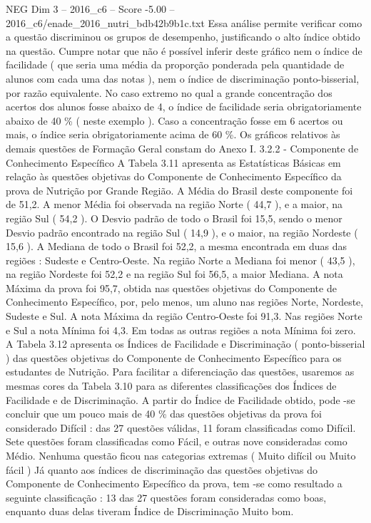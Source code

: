 \begin{textsample}{NEG Dim 3 – 2016\_c6 – Score -5.00 – 2016\_c6/enade\_2016\_nutri\_bdb42b9b1c.txt}
Essa análise permite verificar como a questão discriminou os grupos de desempenho, justificando o alto índice obtido na questão.
Cumpre notar que não é possível inferir deste gráfico nem o índice de facilidade ( que seria uma média da proporção ponderada pela quantidade de alunos com cada uma das notas ), nem o índice de discriminação ponto-bisserial, por razão equivalente.
No caso extremo no qual a grande concentração dos acertos dos alunos fosse abaixo de 4, o índice de facilidade seria obrigatoriamente abaixo de 40 \% ( neste exemplo ).
Caso a concentração fosse em 6 acertos ou mais, o índice seria obrigatoriamente acima de 60 \%.
Os gráficos relativos às demais questões de Formação Geral constam do Anexo I. 3.2.2 - Componente de Conhecimento Específico A Tabela 3.11 apresenta as Estatísticas Básicas em relação às questões objetivas do Componente de Conhecimento Específico da prova de Nutrição por Grande Região.
A Média do Brasil deste componente foi de 51,2.
A menor Média foi observada na região Norte ( 44,7 ), e a maior, na região Sul ( 54,2 ).
O Desvio padrão de todo o Brasil foi 15,5, sendo o menor Desvio padrão encontrado na região Sul ( 14,9 ), e o maior, na região Nordeste ( 15,6 ).
A Mediana de todo o Brasil foi 52,2, a mesma encontrada em duas das regiões : Sudeste e Centro-Oeste.
Na região Norte a Mediana foi menor ( 43,5 ), na região Nordeste foi 52,2 e na região Sul foi 56,5, a maior Mediana.
A nota Máxima da prova foi 95,7, obtida nas questões objetivas do Componente de Conhecimento Específico, por, pelo menos, um aluno nas regiões Norte, Nordeste, Sudeste e Sul.
A nota Máxima da região Centro-Oeste foi 91,3.
Nas regiões Norte e Sul a nota Mínima foi 4,3.
Em todas as outras regiões a nota Mínima foi zero.
A Tabela 3.12 apresenta os Índices de Facilidade e Discriminação ( ponto-bisserial ) das questões objetivas do Componente de Conhecimento Específico para os estudantes de Nutrição.
Para facilitar a diferenciação das questões, usaremos as mesmas cores da Tabela 3.10 para as diferentes classificações dos Índices de Facilidade e de Discriminação.
A partir do Índice de Facilidade obtido, pode -se concluir que um pouco mais de 40 \% das questões objetivas da prova foi considerado Difícil : das 27 questões válidas, 11 foram classificadas como Difícil.
Sete questões foram classificadas como Fácil, e outras nove consideradas como Médio.
Nenhuma questão ficou nas categorias extremas ( Muito difícil ou Muito fácil ) Já quanto aos índices de discriminação das questões objetivas do Componente de Conhecimento Específico da prova, tem -se como resultado a seguinte classificação : 13 das 27 questões foram consideradas como boas, enquanto duas delas tiveram Índice de Discriminação Muito bom.

\end{textsample}

